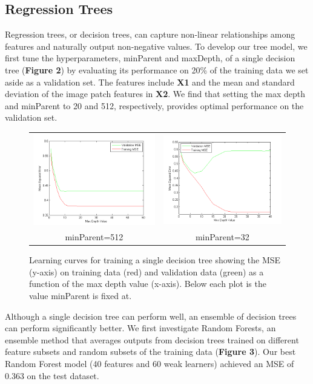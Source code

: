 \documentclass[12pt] {article}
\renewcommand{\baselinestretch}{1.2} %
\begin{document}
\subsection{Regression Trees}
Regression trees, or decision trees, can capture non-linear relationships among features and naturally output non-negative values. To develop our tree model, we first tune the hyperparameters, minParent and maxDepth, of a single decision tree (\textbf{Figure 2}) by evaluating its performance on 20\% of the training data we set aside as a validation set. The features include \textbf{X1} and the mean and standard deviation of the image patch features in \textbf{X2}. We find that setting the max depth and minParent to 20 and 512, respectively, provides optimal performance on the validation set.
\renewcommand{\baselinestretch}{1.0} %
\begin{figure}[h!] \centering
\begin{tabular}{cc}
\includegraphics[width=.45\textwidth]{figdir/maxDepthVersusMSE.png} &
\includegraphics[width=.45\textwidth]{figdir/maxDepthVersusMSE2.png} \\
minParent=512 & minParent=32 \\
\end{tabular}
\caption{Learning curves for training a single decision tree showing the MSE (y-axis) on training data (red) and validation data (green) as a function of the max depth value (x-axis). Below each plot is the value minParent is fixed at.}
\end{figure}
\renewcommand{\baselinestretch}{1.2} %
Although a single decision tree can perform well, an ensemble of decision trees can perform significantly better. We first investigate Random Forests, an ensemble method that averages outputs from decision trees trained on different feature subsets and random subsets of the training data (\textbf{Figure 3}). Our best Random Forest model (40 features and 60 weak learners) achieved an MSE of 0.363 on the test dataset. 
\end{document}

